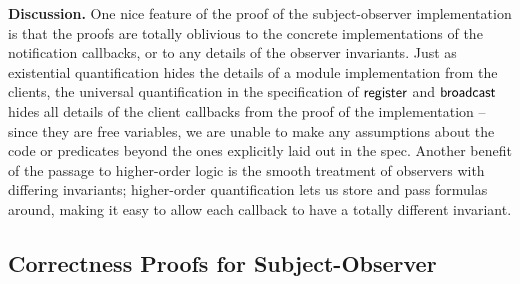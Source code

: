\textbf{Discussion.} One nice feature of the proof of the
subject-observer implementation is that the proofs are totally
oblivious to the concrete implementations of the notification
callbacks, or to any details of the observer invariants. Just as
existential quantification hides the details of a module
implementation from the clients, the universal quantification in the
specification of $\mathsf{register}$ and $\mathsf{broadcast}$ hides all
details of the client callbacks from the proof of the implementation
-- since they are free variables, we are unable to make any
assumptions about the code or predicates beyond the ones explicitly
laid out in the spec. Another benefit of the passage to higher-order
logic is the smooth treatment of observers with differing invariants;
higher-order quantification lets us store and pass formulas around,
making it easy to allow each callback to have a totally different
invariant. 

\subsection{Correctness Proofs for Subject-Observer}

